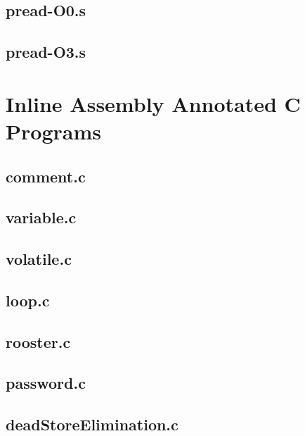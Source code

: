 \begin{appendices}
\subsection{pread-O0.s}

\subsection{pread-O3.s}


\section{Inline Assembly Annotated C Programs}
\label{app:InlineC}
\subsection{comment.c}


\subsection{variable.c}


\subsection{volatile.c}


\subsection{loop.c}


\subsection{rooster.c}


\subsection{password.c}


\subsection{deadStoreElimination.c}



\end{appendices}
